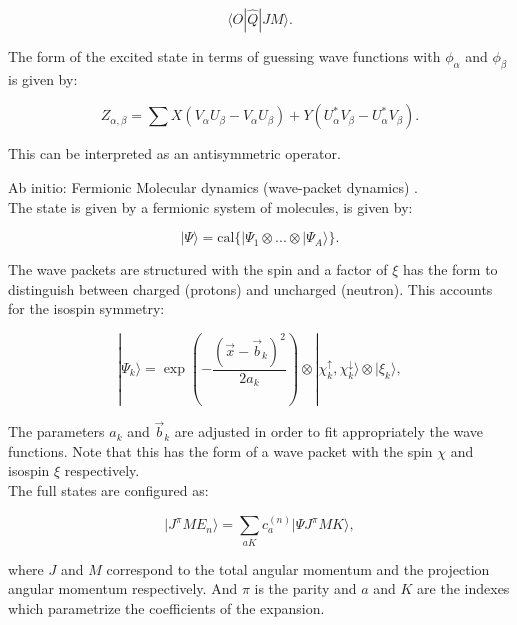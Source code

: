 \documentclass[openany]{book}
\begin{document}
\begin{equation}\label{eq:micro_QHFB_quadrupole}
	\langle  O | \hat Q|  JM \rangle. 
\end{equation}

The form of the excited state in terms of guessing wave functions with $\phi_\alpha$ and $\phi_\beta$ is given by:

\begin{equation}\label{eq:micro_QHFB_densityGround}
	Z_{\alpha, \beta} = \sum {X (V_\alpha U_\beta - V_\alpha U_\beta) + Y (U^{*}_\alpha V_\beta - U^{*}_\alpha V_\beta)}. 
\end{equation}

This can be interpreted as an antisymmetric operator. 

Ab initio: Fermionic Molecular dynamics (wave-packet dynamics) \cite{neff_feldmeier_langanke_2011}. \\

The state is given by a fermionic system of molecules, is given by: 

\begin{equation}\label{eq:micro_FMD_state}
	| \Psi \rangle = \mathrm{cal} \{ |\Psi_1 \otimes ... \otimes |\Psi_A \rangle \}.
\end{equation}

The wave packets are structured with the spin and a factor of $\xi$ has the form to distinguish between charged (protons) and uncharged (neutron). This accounts for the isospin symmetry:

\begin{equation} \label{eq:micro_FMD_wavePacket}
	|\Psi_k \rangle = \exp {\left ( - \frac{(\vec x - \vec b_k)^2}{2a_k} \right)} \otimes |\chi^{\uparrow}_k,  \chi^{\downarrow}_k \rangle \otimes |\xi_k \rangle, 
\end{equation}

The parameters $a_k$ and $\vec b_k$ are adjusted in order to fit appropriately the wave functions. Note that this has the form of a wave packet with the spin  $\chi$ and isospin  $\xi$ respectively. \\


The full states are configured as: 

\begin{equation} \label{eq:micro_FMD_generalState}
	| J^{\pi} M E_n \rangle = \sum_{aK}{c^{(n)}_a | \Psi J^\pi MK \rangle} , 
\end{equation}

where $J$ and $M$ correspond to the total angular momentum and the projection angular momentum respectively. And $\pi$ is the parity and $a$ and $K$ are the indexes which parametrize the coefficients of the expansion.  \\
\end{document}
